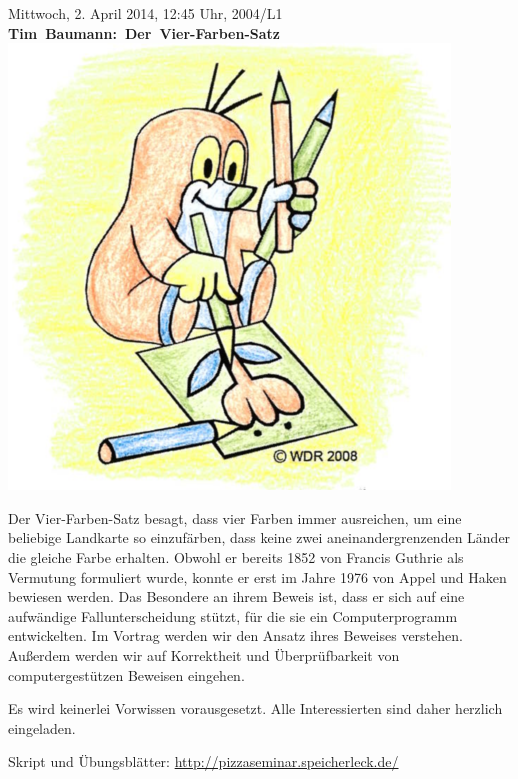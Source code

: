 \documentclass[a4paper,ngerman,landscape]{scrartcl}
\begin{document}
\begin{center}
  \huge
  Mittwoch, 2. April 2014, 12:45 Uhr, 2004/L1 \\
  \mbox{\textbf{Tim Baumann: Der Vier-Farben-Satz}}
  \vfill
  \vspace{0.3em}
  \includegraphics[scale=2.55]{vier-farben-satz-ausgemalt}
  \vfill

  \Large
  \begin{minipage}{0.85\textwidth}
    \setlength\parskip{\medskipamount}
    \vspace{0.3em}
    Der Vier-Farben-Satz besagt, dass vier Farben immer ausreichen, um eine
    beliebige Landkarte so einzufärben, dass keine zwei aneinandergrenzenden
    Länder die gleiche Farbe erhalten. Obwohl er bereits 1852 von Francis
    Guthrie als Vermutung formuliert wurde, konnte er erst im Jahre 1976 von
    Appel und Haken bewiesen werden. Das Besondere an ihrem Beweis ist, dass er
    sich auf eine aufwändige Fallunterscheidung stützt, für die sie ein
    Computerprogramm entwickelten. Im Vortrag werden wir den Ansatz ihres
    Beweises verstehen. Außerdem werden wir auf Korrektheit und
    Überprüfbarkeit von computergestützen Beweisen eingehen.

    Es wird keinerlei Vorwissen vorausgesetzt. Alle Interessierten sind
    daher herzlich eingeladen.

    \vspace{1em}
    \hfill\small Skript und Übungsblätter: \url{http://pizzaseminar.speicherleck.de/}
  \end{minipage}
\end{center}
\end{document}
